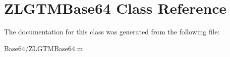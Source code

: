 \hypertarget{class_z_l_g_t_m_base64}{\section{Z\+L\+G\+T\+M\+Base64 Class Reference}
\label{class_z_l_g_t_m_base64}
}


The documentation for this class was generated from the following file\+:\begin{DoxyCompactItemize}
\item 
Base64/Z\+L\+G\+T\+M\+Base64.\+m\end{DoxyCompactItemize}
